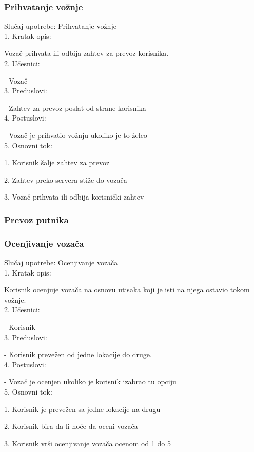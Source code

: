 \subsubsection{\bfseries Prihvatanje vo\v znje}
\noindent Slučaj upotrebe: Prihvatanje vožnje \\
1. Kratak opis:
\par Vozač prihvata ili odbija zahtev za prevoz korisnika. \\
2.  Učesnici:  
\par - Vozač \\
3. Preduslovi: 
\par - Zahtev za prevoz poslat od strane korisnika \\
4. Postuslovi:
\par - Vozač je prihvatio vožnju ukoliko je to želeo \\
5. Osnovni tok:
\par 1. Korisnik šalje zahtev za prevoz
\par 2.  Zahtev preko servera stiže do vozača
\par 3.  Vozač prihvata ili odbija korisnički zahtev \\

\subsubsection{\bfseries Prevoz putnika}

\subsubsection{\bfseries Ocenjivanje voza\v ca}
\noindent Slučaj upotrebe: Ocenjivanje vozača \\
1. Kratak opis: 
\par Korisnik ocenjuje vozača na osnovu utisaka koji je isti na njega ostavio tokom vožnje. \\
2.  Učesnici:  
\par - Korisnik \\
3. Preduslovi: 
\par - Korisnik prevežen od jedne lokacije do druge. \\
4. Postuslovi:
\par - Vozač je ocenjen ukoliko je korisnik izabrao tu opciju \\
5. Osnovni tok:
\par 1. Korisnik je prevežen sa jedne lokacije na drugu
\par 2.  Korisnik bira da li hoće da oceni vozača
\par 3.  Korisnik vrši ocenjivanje vozača ocenom od 1 do 5 \\


